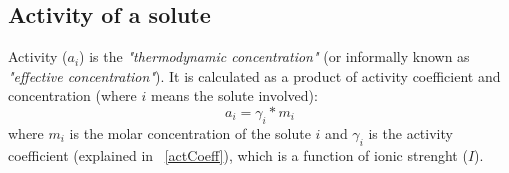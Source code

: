 









\subsection{Activity of a solute}\label{activity}
Activity ($a_i$) is the \emph{"thermodynamic concentration"} (or informally known as \emph{"effective concentration"}). It is calculated as a product of activity coefficient and concentration (where $i$ means the solute involved):
\begin{equation}\label{activityEq}
a_i = \gamma_i * m_i
\end{equation}
where $m_i$ is the molar concentration of the solute $i$ and $\gamma_i$ is the activity coefficient (explained in ~\ref{actCoeff}), which is a function of ionic strenght ($I$).

